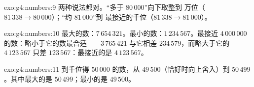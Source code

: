 \begin{solution}{exo:g4:numbers:9}
两种说法都对。“多于 $80\,000$”向下取整到
万位（$81\,338 \to 80\,000$）；“约 $81\,000$”到
最接近的千位（$81\,338 \to 81\,000$）。
\end{solution}

\begin{solution}{exo:g4:numbers:10}
最大的数：$7\,654\,321$。最小的数：$1\,234\,567$。最接近
$4\,000\,000$ 的数：略小于它的数最合适——$3\,765\,421$ 与它相差
$234\,579$，而略大于它的 $4\,123\,567$ 只差
$123\,567$：最接近的是 $4\,123\,567$。
\end{solution}

\begin{solution}{exo:g4:numbers:11}
到千位得 $50\,000$ 的数，从
$49\,500$（恰好时向上舍入）到 $50\,499$。其中最大的是
$50\,499$；最小的是 $49\,500$。
\end{solution}
